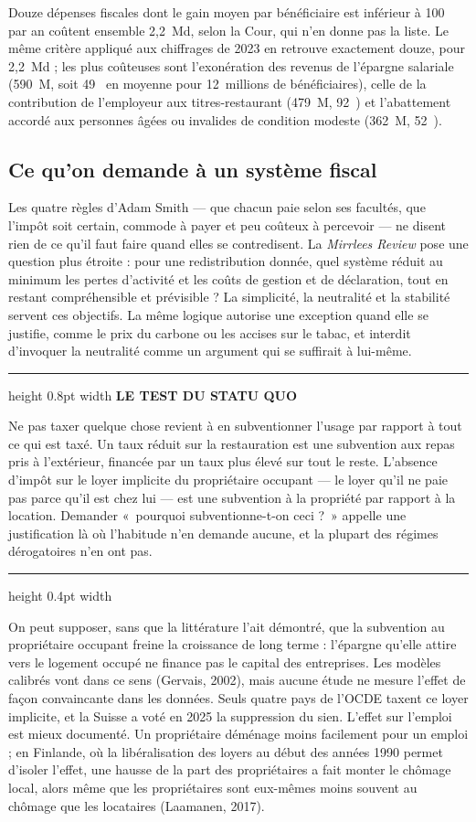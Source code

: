 \documentclass[11pt,a4paper]{article}
\providecommand{\euro}{\texteuro}
\newenvironment{encadre}[1]
  {\par\medskip\noindent\begin{minipage}{\linewidth}%
   \color{encre}\setlength{\parskip}{0.6em}%
   \hrule height 0.8pt width \linewidth \vspace{6pt}%
   {\footnotesize\bfseries\color{vert}\MakeUppercase{#1}}\par\vspace{-2pt}%
   \small}
  {\par\vspace{4pt}\hrule height 0.4pt width \linewidth\end{minipage}\par\medskip}
\begin{document}
Douze dépenses fiscales dont le gain moyen par bénéficiaire est inférieur à 100~\euro{} par an
coûtent ensemble 2,2~Md\euro{}, selon la Cour, qui n'en donne pas la liste. Le même critère appliqué
aux chiffrages de 2023 en retrouve exactement douze, pour 2,2~Md\euro{} ; les plus coûteuses sont
l'exonération des revenus de l'épargne salariale (590~M\euro{}, soit 49~\euro{} en moyenne pour
12~millions de bénéficiaires), celle de la contribution de l'employeur aux titres-restaurant
(479~M\euro{}, 92~\euro{}) et l'abattement accordé aux personnes âgées ou invalides de condition
modeste (362~M\euro{}, 52~\euro{}).

\subsection{Ce qu'on demande à un système fiscal}

Les quatre règles d'Adam Smith --- que chacun paie selon ses facultés, que l'impôt soit certain,
commode à payer et peu coûteux à percevoir --- ne disent rien de ce qu'il faut faire quand elles se
contredisent. La \emph{Mirrlees Review} pose une question plus étroite : pour une redistribution
donnée, quel système réduit au minimum les pertes d'activité et les coûts de gestion et de
déclaration, tout en restant compréhensible et prévisible ? La simplicité, la neutralité et la
stabilité servent ces objectifs. La même logique autorise une exception quand elle se justifie,
comme le prix du carbone ou les accises sur le tabac, et interdit d'invoquer la neutralité comme un
argument qui se suffirait à lui-même.

\begin{encadre}{Le test du statu quo}
Ne pas taxer quelque chose revient à en subventionner l'usage par rapport à tout ce qui est taxé.
Un taux réduit sur la restauration est une subvention aux repas pris à l'extérieur, financée par
un taux plus élevé sur tout le reste. L'absence d'impôt sur le loyer implicite du propriétaire
occupant --- le loyer qu'il ne paie pas parce qu'il est chez lui --- est une subvention à la
propriété par rapport à la location. Demander «~pourquoi subventionne-t-on ceci ?~» appelle une
justification là où l'habitude n'en demande aucune, et la plupart des régimes dérogatoires n'en
ont pas.
\end{encadre}

On peut supposer, sans que la littérature l'ait démontré, que la subvention au propriétaire
occupant freine la croissance de long terme : l'épargne qu'elle attire vers le logement occupé ne
finance pas le capital des entreprises. Les modèles calibrés vont dans ce sens (Gervais, 2002), mais
aucune étude ne mesure l'effet de façon convaincante dans les données. Seuls quatre pays de l'OCDE
taxent ce loyer implicite, et la Suisse a voté en 2025 la suppression du sien. L'effet sur l'emploi
est mieux documenté. Un propriétaire déménage moins facilement pour un emploi ; en Finlande, où la
libéralisation des loyers au début des années 1990 permet d'isoler l'effet, une hausse de la part
des propriétaires a fait monter le chômage local, alors même que les propriétaires sont eux-mêmes
moins souvent au chômage que les locataires (Laamanen, 2017).
\end{document}
